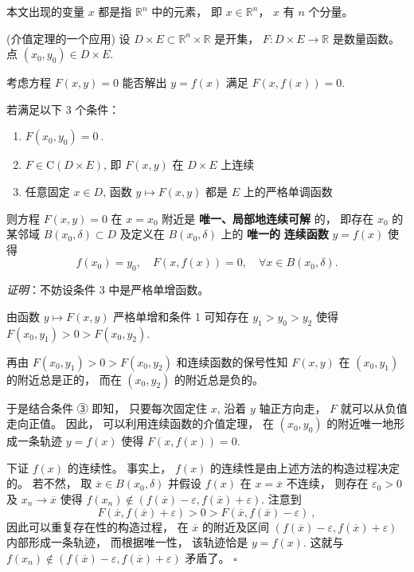 

本文出现的变量 $x$ 都是指 $\mathbb{R}^n$ 中的元素， 即 $x\in\mathbb{R}^n$， $x$ 有 $n$ 个分量。

\begin{theorem}{(介值定理的一个应用)}\label{the_impli_1}
设 $D\times E\subset\mathbb{R}^{n}\times\mathbb{R}$ 是开集，
$F:D\times E\rightarrow\mathbb{R}$ 是数量函数。 点 $(x_{0},y_{0})\in D\times E.$ 

考虑方程 $F(x,y)=0$ 能否解出 $y=f(x)$ 满足 $F(x,f(x))=0.$ 

若满足以下 3 个条件：

\begin{enumerate}
\item $F(x_{0},y_{0})=0~.$
\item $F\in\mathrm{C}(D\times E)$, 即 $F(x,y)$ 在 $D\times E$ 上连续
\item 任意固定 $x\in D$, 函数 $y\mapsto F(x,y)$ 都是 $E$ 上的严格单调函数
\end{enumerate}

则方程 $F(x,y)=0$ 在 $x=x_{0}$ 附近是\textbf{ 唯一、局部地连续可解} 的， 即存在 $x_{0}$
的某邻域 $B(x_{0},\delta)\subset D$ 及定义在 $B(x_{0},\delta)$ 上的 \textbf{唯一的}\textbf{
连续函数} $y=f(x)$ 使得
\[
f(x_{0})=y_{0},\quad F(x,f(x))=0,\quad\forall x\in B(x_{0},\delta).
\]
\end{theorem}

\textsl{证明}：不妨设条件 3 中是严格单增函数。 

由函数 $y\mapsto F(x,y)$ 严格单增和条件 1 可知存在 $y_{1}>y_{0}>y_{2}$ 使得 $F(x_{0},y_{1})>0>F(x_{0},y_{2})$. 

再由 $F(x_{0},y_{1})>0>F(x_{0},y_{2})$ 和连续函数的保号性知 $F(x,y)$ 在 $(x_{0},y_{1})$
的附近总是正的， 而在 $(x_{0},y_{2})$ 的附近总是负的。 

于是结合条件 ③ 即知， 只要每次固定住 $x$, 沿着 $y$ 轴正方向走， $F$ 就可以从负值走向正值。 因此， 可以利用连续函数的介值定理，
在 $(x_{0},y_{0})$ 的附近唯一地形成一条轨迹 $y=f(x)$ 使得 $F(x,f(x))=0$. 

下证 $f(x)$ 的连续性。 事实上， $f(x)$ 的连续性是由上述方法的构造过程决定的。 若不然， 取 $\overline{x}\in B(x_0,\delta)$ 并假设 $f(x)$ 在
$x=\overline{x}$ 不连续， 则存在 $\varepsilon_{0}>0$ 及 $x_{n}\rightarrow\overline{x}$
使得 $f(x_{n})\notin(f(\overline{x})-\varepsilon,f(\overline{x})+\varepsilon)$.
注意到
\[
F(\overline{x},f(\overline{x})+\varepsilon)>0>F(\overline{x},f(\overline{x})-\varepsilon)~,
\]
因此可以重复存在性的构造过程， 在 \textbf{$\overline{x}$ }的附近及区间 $(f(\overline{x})-\varepsilon,f(\overline{x})+\varepsilon)$
内部形成一条轨迹， 而根据唯一性， 该轨迹恰是 $y=f(x)$. 这就与 $f(x_{n})\notin(f(\overline{x})-\varepsilon,f(\overline{x})+\varepsilon)$
矛盾了。 $\square$ 

